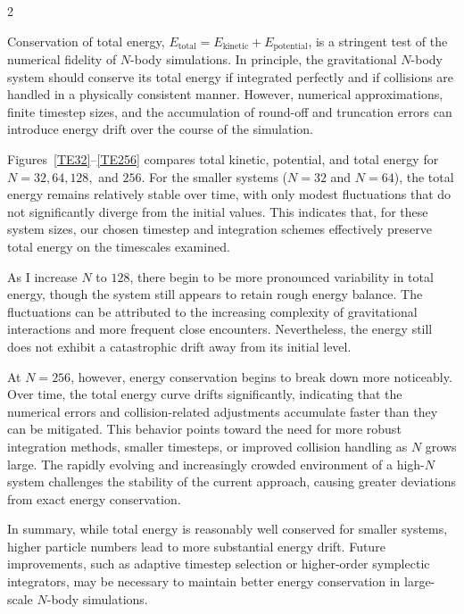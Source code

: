 \documentclass[a4paper, 12pt, oneside, onecolumn]{article}
\begin{document}
\begin{multicols}{2}

Conservation of total energy, $E_{\text{total}} = E_{\text{kinetic}} + E_{\text{potential}}$, is a stringent test of the numerical fidelity of $N$-body simulations. In principle, the gravitational $N$-body system should conserve its total energy if integrated perfectly and if collisions are handled in a physically consistent manner. However, numerical approximations, finite timestep sizes, and the accumulation of round-off and truncation errors can introduce energy drift over the course of the simulation.

Figures~\ref{TE32}--\ref{TE256} compares total kinetic, potential, and total energy for $N = 32, 64, 128,$ and $256$. For the smaller systems ($N = 32$ and $N = 64$), the total energy remains relatively stable over time, with only modest fluctuations that do not significantly diverge from the initial values. This indicates that, for these system sizes, our chosen timestep and integration schemes effectively preserve total energy on the timescales examined.

As I increase $N$ to $128$, there begin to be more pronounced variability in total energy, though the system still appears to retain rough energy balance. The fluctuations can be attributed to the increasing complexity of gravitational interactions and more frequent close encounters. Nevertheless, the energy still does not exhibit a catastrophic drift away from its initial level.

At $N = 256$, however, energy conservation begins to break down more noticeably. Over time, the total energy curve drifts significantly, indicating that the numerical errors and collision-related adjustments accumulate faster than they can be mitigated. This behavior points toward the need for more robust integration methods, smaller timesteps, or improved collision handling as $N$ grows large. The rapidly evolving and increasingly crowded environment of a high-$N$ system challenges the stability of the current approach, causing greater deviations from exact energy conservation.

In summary, while total energy is reasonably well conserved for smaller systems, higher particle numbers lead to more substantial energy drift. Future improvements, such as adaptive timestep selection or higher-order symplectic integrators, may be necessary to maintain better energy conservation in large-scale $N$-body simulations.

\end{multicols}
\end{document}
